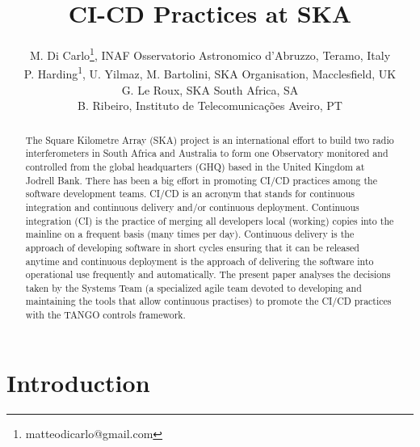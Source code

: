 \documentclass[a4paper,
               keeplastbox,   %
               ]{jacow}
\begin{document}
\title{CI-CD Practices at SKA}

\author{M. Di Carlo\thanks{matteodicarlo@gmail.com}, INAF Osservatorio Astronomico d'Abruzzo, Teramo, Italy \\
        P. Harding\textsuperscript{1}, U. Yilmaz, M. Bartolini, SKA Organisation, Macclesfield, UK \\
        G. Le Roux, SKA South Africa, SA \\
        B. Ribeiro, Instituto de Telecomunicações Aveiro, PT}

\maketitle

\begin{abstract}
The Square Kilometre Array (SKA) project is an international effort to build two radio interferometers in South Africa and Australia to form one Observatory monitored and controlled from the global headquarters (GHQ) based in the United Kingdom at Jodrell Bank. There has been a big effort in promoting CI/CD practices among the software development teams. CI/CD is an acronym that stands for continuous integration and continuous delivery and/or continuous deployment. Continuous integration (CI) is the practice of merging all developers local (working) copies into the mainline on a frequent basis (many times per day). Continuous delivery is the approach of developing software in short cycles ensuring that it can be released anytime and continuous deployment is the approach of delivering the software into operational use frequently and automatically. The present paper analyses the decisions taken by the Systems Team (a specialized agile team devoted to developing and maintaining the tools that allow continuous practises) to promote the CI/CD practices with the TANGO controls framework.
\end{abstract}

\section{Introduction}
\label{sec:intro}  %
\end{document}
